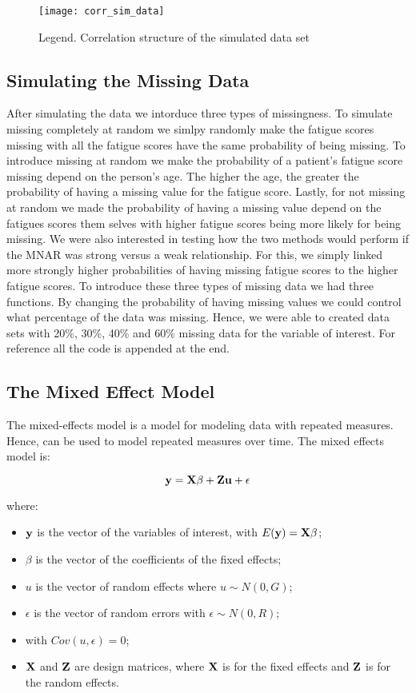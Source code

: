 \documentclass[fleqn,10pt]{wlscirep}\usepackage[]{graphicx}\usepackage[]{color}
\begin{document}
\begin{figure}[H]
\centering
\texttt{[image: corr\_sim\_data]}
\caption{Legend. Correlation structure of the simulated data set}
\label{fig:corr_sim_data}
\end{figure}


\subsection{Simulating the Missing Data}

After simulating the data we intorduce three types of missingness. To simulate missing completely at random we simlpy randomly make the fatigue scores missing with all the fatigue scores have the same probability of being missing. To introduce missing at random we make the probability of a patient's fatigue score missing depend on the person's age. The higher the age, the greater the probability of having a missing value for the fatigue score. Lastly, for not missing at random we made the probability of having a missing value depend on the fatigues scores them selves with higher fatigue scores being more likely for being missing. We were also interested in testing how the two methods would perform if the MNAR was strong versus a weak relationship. For this, we simply linked more strongly higher probabilities of having missing fatigue scores to the higher fatigue scores. To introduce these three types of missing data we had three functions. By changing the probability of having missing values we could control what percentage of the data was missing. Hence, we were able to created data sets with 20\%, 30\%, 40\% and 60\% missing data for the variable of interest. For reference all the code is appended at the end. 

\subsection{The Mixed Effect Model}

The mixed-effects model is a model for modeling data with repeated measures. Hence, can be used to model repeated measures over time. The mixed effects model is:

$$\bold{y} = \bold{X \beta + Zu + \epsilon}$$


where:

\begin{itemize}
\item $\bold{y}$ is the vector of the variables of interest, with $E(\bold{y}) = \bold{X\beta}$;
\item $\beta$ is the vector of the coefficients of the fixed effects;
\item $u$ is the vector of random effects where $u \sim N(0, G)$;
\item $\epsilon$ is the vector of random errors with $\epsilon \sim N(0, R)$;
\item with $Cov(u,\epsilon) = 0$;
\item  $\bold{X}$ and $\bold{Z}$ are design matrices, where $\bold{X}$ is for the fixed effects and $\bold{Z}$ is for the random effects. 
\end{itemize}
\end{document}
